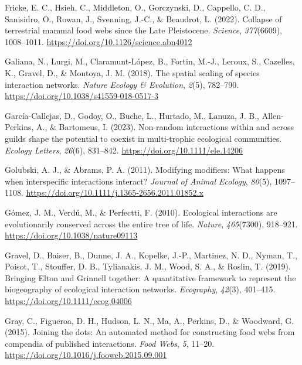 \documentclass[
]{article}
\newlength{\cslhangindent}
\newenvironment{CSLReferences}[2] %
 {\begin{list}{}{%
  \setlength{\itemindent}{0pt}
  \setlength{\leftmargin}{0pt}
  \setlength{\parsep}{0pt}
  \ifodd #1
   \setlength{\leftmargin}{\cslhangindent}
   \setlength{\itemindent}{-1\cslhangindent}
  \fi
  \setlength{\itemsep}{#2\baselineskip}}}
 {\end{list}}
\begin{document}
\begin{CSLReferences}{1}{0}
Fricke, E. C., Hsieh, C., Middleton, O., Gorczynski, D., Cappello, C.
D., Sanisidro, O., Rowan, J., Svenning, J.-C., \& Beaudrot, L. (2022).
Collapse of terrestrial mammal food webs since the {Late Pleistocene}.
\emph{Science}, \emph{377}(6609), 1008--1011.
\url{https://doi.org/10.1126/science.abn4012}

Galiana, N., Lurgi, M., Claramunt-López, B., Fortin, M.-J., Leroux, S.,
Cazelles, K., Gravel, D., \& Montoya, J. M. (2018). The spatial scaling
of species interaction networks. \emph{Nature Ecology \& Evolution},
\emph{2}(5), 782--790. \url{https://doi.org/10.1038/s41559-018-0517-3}

García-Callejas, D., Godoy, O., Buche, L., Hurtado, M., Lanuza, J. B.,
Allen-Perkins, A., \& Bartomeus, I. (2023). Non-random interactions
within and across guilds shape the potential to coexist in multi-trophic
ecological communities. \emph{Ecology Letters}, \emph{26}(6), 831--842.
\url{https://doi.org/10.1111/ele.14206}

Golubski, A. J., \& Abrams, P. A. (2011). Modifying modifiers: What
happens when interspecific interactions interact? \emph{Journal of
Animal Ecology}, \emph{80}(5), 1097--1108.
\url{https://doi.org/10.1111/j.1365-2656.2011.01852.x}

Gómez, J. M., Verdú, M., \& Perfectti, F. (2010). Ecological
interactions are evolutionarily conserved across the entire tree of
life. \emph{Nature}, \emph{465}(7300), 918--921.
\url{https://doi.org/10.1038/nature09113}

Gravel, D., Baiser, B., Dunne, J. A., Kopelke, J.-P., Martinez, N. D.,
Nyman, T., Poisot, T., Stouffer, D. B., Tylianakis, J. M., Wood, S. A.,
\& Roslin, T. (2019). Bringing {Elton} and {Grinnell} together: A
quantitative framework to represent the biogeography of ecological
interaction networks. \emph{Ecography}, \emph{42}(3), 401--415.
\url{https://doi.org/10.1111/ecog.04006}

Gray, C., Figueroa, D. H., Hudson, L. N., Ma, A., Perkins, D., \&
Woodward, G. (2015). Joining the dots: {An} automated method for
constructing food webs from compendia of published interactions.
\emph{Food Webs}, \emph{5}, 11--20.
\url{https://doi.org/10.1016/j.fooweb.2015.09.001}


\end{CSLReferences}
\end{document}
